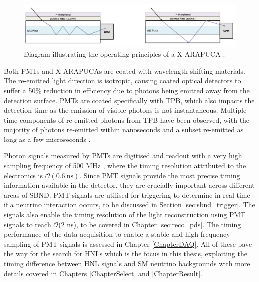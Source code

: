 \begin{figure}[htbp] 
\centering    
\includegraphics[width=1.0\textwidth]{xarapuca}
\caption[X-ARAPUCA Diagram]{
Diagram illustrating the operating principles of a X-ARAPUCA \cite{xarapuca}.
}
\label{fig:xarapuca}
\end{figure}

Both PMTs and X-ARAPUCAs are coated with wavelength shifting materials.
The re-emitted light direction is isotropic, causing coated optical detectors to suffer a 50\% reduction in efficiency due to photons being emitted away from the detection surface.
PMTs are coated specifically with TPB, which also impacts the detection time as the emission of visible photons is not instantaneous.
Multiple time components of re-emitted photons from TPB have been observed, with the majority of photons re-emitted within nanoseconds and a subset re-emitted as long as a few microseconds \cite{tpb_time}.

Photon signals measured by PMTs are digitised and readout with a very high sampling frequency of 500 MHz \cite{sbnd_det}, 
where the timing resolution attributed to the electronics is $\mathcal{O}(0.6~\mathrm{ns})$.
Since PMT signals provide the most precise timing information available in the detector, they are crucially important across different areas of SBND.
PMT signals are utilised for triggering to determine in real-time if a neutrino interaction occurs, to be discussed in Section \ref{sec:sbnd_trigger}.
The signals also enable the timing resolution of the light reconstruction using PMT signals to reach $\mathcal{O}$(2 ns), to be covered in Chapter \ref{sec:reco_pds}.
The timing performance of the data acquisition to enable a stable and high frequency sampling of PMT signals is assessed in Chapter \ref{ChapterDAQ}.
All of these pave the way for the search for HNLs which is the focus in this thesis, exploiting the timing difference between HNL signals and SM neutrino backgrounds with more details covered in Chapters \ref{ChapterSelect} and \ref{ChapterResult}.


